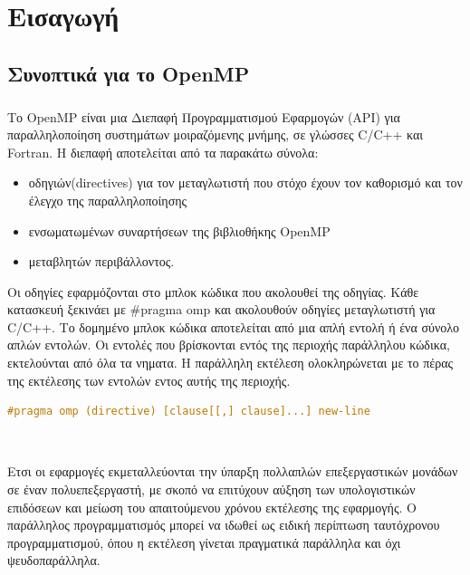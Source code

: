\documentclass[12pt]{article}
\newcommand{\en}[1]{\foreignlanguage{english}{#1}}
\newcommand{\el}[1]{\selectlanguage{greek}{#1}\selectlanguage{english}}
\begin{document}
\clearpage
\singlespacing
\tableofcontents
{}

\renewcommand{\listfigurename}{Κατάλογος Εικόνων (αν υπάρχουν)}
\clearpage
\listoffigures

\renewcommand{\listtablename}{Κατάλογος Πινάκων (αν υπάρχουν)}
\clearpage
\listoftables

\clearpage
\begin{flushleft}
\lstlistoflistings
\end{flushleft}

\clearpage
\setcounter{page}{1}

\section{Εισαγωγή}
\subsection{Συνοπτικά για το \en{OpenMP}}
\subparagraph{}
Το \en{OpenMP} είναι μια Διεπαφή Προγραμματισμού Εφαρμογών \en{(API)} για παραλληλοποίηση συστημάτων μοιραζόμενης μνήμης, σε γλώσσες \en{C/C++} και \en{Fortran}. Η διεπαφή αποτελείται από τα παρακάτω σύνολα\cite{thenextstep20}:
\begin{itemize}
    \item οδηγιών\en{(directives)} για τον μεταγλωτιστή που στόχο έχουν τον καθορισμό και τον έλεγχο της παραλληλοποίησης
    \item ενσωματωμένων συναρτήσεων της βιβλιοθήκης \en{OpenMP}
    \item μεταβλητών περιβάλλοντος.
\end{itemize}



Οι οδηγίες εφαρμόζονται στο μπλοκ κώδικα που ακολουθεί της οδηγίας. Κάθε κατασκευή ξεκινάει με \en{\#pragma omp} και ακολουθούν οδηγίες μεταγλωτιστή για \en{C/C++}. Το δομημένο μπλοκ κώδικα αποτελείται από μια απλή εντολή ή ένα σύνολο απλών εντολών\cite{ompsyntaxrefguide}. Οι εντολές που βρίσκονται εντός της περιοχής παράλληλου κώδικα, εκτελούνται από όλα τα νηματα. Η παράλληλη εκτέλεση ολοκληρώνεται με το πέρας της εκτέλεσης των εντολών εντος αυτής της περιοχής.

\begin{lstlisting}[language=C++, caption={\el{Γραμματική σύνταξης οδηγίας} OpenMP}, frame = single, xleftmargin=.1\textwidth]
#pragma omp (directive) [clause[[,] clause]...] new-line
\end{lstlisting} 
\ \\
\par 
Ετσι οι εφαρμογές εκμεταλλεύονται την ύπαρξη πολλαπλών επεξεργαστικών μονάδων σε έναν πολυεπεξεργαστή, με σκοπό να επιτύχουν αύξηση των υπολογιστικών επιδόσεων και μείωση του απαιτούμενου χρόνου εκτέλεσης της εφαρμογής. Ο παράλληλος προγραμματισμός μπορεί να ιδωθεί ως ειδική περίπτωση ταυτόχρονου προγραμματισμού, όπου η εκτέλεση γίνεται πραγματικά παράλληλα και όχι ψευδοπαράλληλα\cite{googleparallelprog}.
\clearpage
\end{document}
